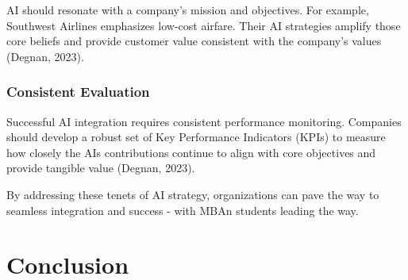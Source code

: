 \documentclass[
]{book}
\begin{document}
AI should resonate with a company's mission and objectives. For example, Southwest Airlines emphasizes low-cost airfare. Their AI strategies amplify those core beliefs and provide customer value consistent with the company's values (Degnan, 2023).

\hypertarget{consistent-evaluation}{%
\subsection{Consistent Evaluation}\label{consistent-evaluation}}

Successful AI integration requires consistent performance monitoring. Companies should develop a robust set of Key Performance Indicators (KPIs) to measure how closely the AIs contributions continue to align with core objectives and provide tangible value (Degnan, 2023).

By addressing these tenets of AI strategy, organizations can pave the way to seamless integration and success - with MBAn students leading the way.

\hypertarget{conclusion}{%
\chapter{Conclusion}\label{conclusion}}
\end{document}
